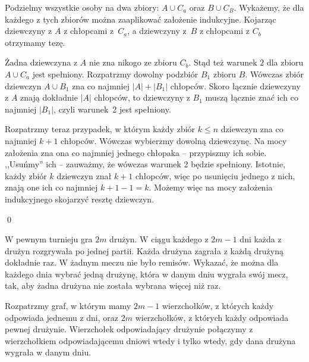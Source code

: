 \vspace{10px}
\noindent
Podzielmy wszystkie osoby na dwa zbiory: $A \cup C_a$ oraz $B \cup C_B$. Wykażemy, że dla każdego z tych zbiorów można zaaplikować założenie indukcyjne. Kojarząc dziewczyny z $A$ z chłopcami z~$C_a$, a dziewczyny z~$B$ z chłopcami z $C_b$ otrzymamy tezę.

\vspace{10px}
\noindent
Żadna dziewczyna z $A$ nie zna nikogo ze zbioru $C_b$. Stąd też warunek $2$ dla zbioru $A \cup C_a$ jest spełniony. Rozpatrzmy dowolny podzbiór $B_1$ zbioru $B$. Wówczas zbiór dziewczyn $A \cup B_1$ zna co najmniej $|A| + |B_1|$ chłopców. Skoro łącznie dziewczyny z $A$ znają dokładnie $|A|$ chłopców, to dziewczyny z $B_1$ muszą łącznie znać ich co najmniej $|B_1|$, czyli warunek~2 jest spełniony.

\vspace{10px}
\noindent
Rozpatrzmy teraz przypadek, w którym każdy zbiór $k \leqslant n$ dziewczyn zna co najmniej $k + 1$ chłopców. Wówczas wybierzmy dowolną dziewczynę. Na mocy założenia zna ona co najmniej jednego chłopaka -- przypiszmy ich sobie. ,,Usuńmy'' ich -- zauważmy, że wówczas warunek 2 będzie spełniony. Istotnie, każdy zbiór $k$ dziewczyn znał $k + 1$ chłopców, więc po usunięciu jednego z nich, znają one ich co najmniej $k + 1 - 1 = k$. Możemy więc na mocy założenia indukcyjnego skojarzyć resztę dziewczyn.

\qed

\newpage


\noindent
W pewnym turnieju gra $2m$ drużyn. W ciągu każdego z $2m - 1$ dni każda z drużyn rozgrywała po jednej partii. Każda drużyna zagrała z każdą drużyną dokładnie raz. W żadnym meczu nie było remisów. Wykazać, że można dla każdego dnia wybrać jedną drużynę, która w danym dniu wygrała swój mecz, tak, aby żadna drużyna nie została wybrana więcej niż raz.

\vspace{5px}


\vspace{5px}
\noindent
Rozpatrzmy graf, w którym mamy $2m - 1$ wierzchołków, z których każdy odpowiada jednemu z dni, oraz $2m$ wierzchołków, z których każdy odpowiada pewnej drużynie. Wierzchołek odpowiadający drużynie połączymy z wierzchołkiem odpowiadającemu dniowi wtedy i tylko wtedy, gdy dana drużyna wygrała w danym dniu.

